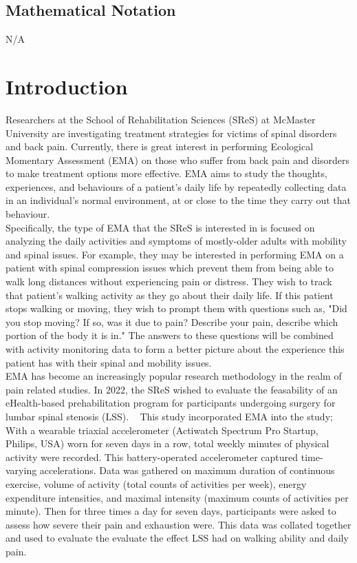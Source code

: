 \documentclass[12pt]{article}
\begin{document}
\subsection{Mathematical Notation}
N/A


\section{Introduction}
\label{Intro}

Researchers at the School of Rehabilitation Sciences (SReS) at McMaster University are investigating treatment strategies for victims of spinal disorders and back pain. Currently, there is great interest in performing Ecological Momentary Assessment (EMA) on those who suffer from back pain and disorders to make treatment options more effective. EMA aims to study the thoughts, experiences, and behaviours of a patient's daily life by repeatedly collecting data in an individual's normal environment, at or close to the time they carry out that behaviour.\\

Specifically, the type of EMA that the SReS is interested in is focused on analyzing the daily activities and symptoms of mostly-older adults with mobility and spinal issues. For example, they may be interested in performing EMA on a patient with spinal compression issues which prevent them from being able to walk long distances without experiencing pain or distress. They wish to track that patient's walking activity as they go about their daily life. If this patient stops walking or moving, they wish to prompt them with questions such as, "Did you stop moving? If so, was it due to pain? Describe your pain, describe which portion of the body it is in." The answers to these questions will be combined with activity monitoring data to form a better picture about the experience this patient has with their spinal and mobility issues.\\

EMA has become an increasingly popular research methodology in the realm of pain related studies. In 2022, the SReS wished to evaluate the feasability of an eHealth-based prehabilitation program for participants undergoing surgery for lumbar spinal stenosis (LSS). ~\cite{MacedoPilotTrial} This study incorporated EMA into the study; With a wearable triaxial accelerometer (Actiwatch Spectrum Pro Startup, Philips, USA) worn for seven days in a row, total weekly minutes of physical activity were recorded. This battery-operated accelerometer captured time-varying accelerations. Data was gathered on maximum duration of continuous exercise, volume of activity (total counts of activities per week), energy expenditure intensities, and maximal intensity (maximum counts of activities per minute). Then for three times a day for seven days, participants were asked to assess how severe their pain and exhaustion were. This data was collated together and used to evaluate the evaluate the effect LSS had on walking ability and daily pain. \\
\end{document}
